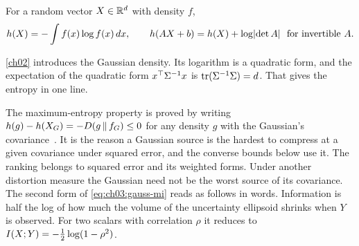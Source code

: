 \begin{definition}\label{def:ch03:h}
For a random vector $X\in\mathbb{R}^d$ with density $f$,
\begin{equation}\label{eq:ch03:h}
\h(X)=-\int f(x)\log f(x)\,dx,\qquad \h(AX+b)=\h(X)+\log\abs{\det A}\ \text{ for invertible } A.
\end{equation}
\end{definition}

\cref{ch02} introduces the Gaussian density. Its logarithm is a quadratic form, and the expectation of the quadratic form $x^{\top}\Sigma^{-1}x$ is $\operatorname{tr}(\Sigma^{-1}\Sigma)=d$. That gives the entropy in one line.


The maximum-entropy property is proved by writing $h(g)-h(X_G)=-D\!\left(g\,\middle\|\,f_G\right)\le0$ for any density $g$ with the Gaussian's covariance~\cite{coverthomas2006}. It is the reason a Gaussian source is the hardest to compress at a given covariance under squared error, and the converse bounds below use it. The ranking belongs to squared error and its weighted forms. Under another distortion measure the Gaussian need not be the worst source of its covariance. The second form of \eqref{eq:ch03:gauss-mi} reads as follows in words. Information is half the log of how much the volume of the uncertainty ellipsoid shrinks when $Y$ is observed. For two scalars with correlation $\rho$ it reduces to $I(X;Y)=-\frac12\log(1-\rho^2)$.

